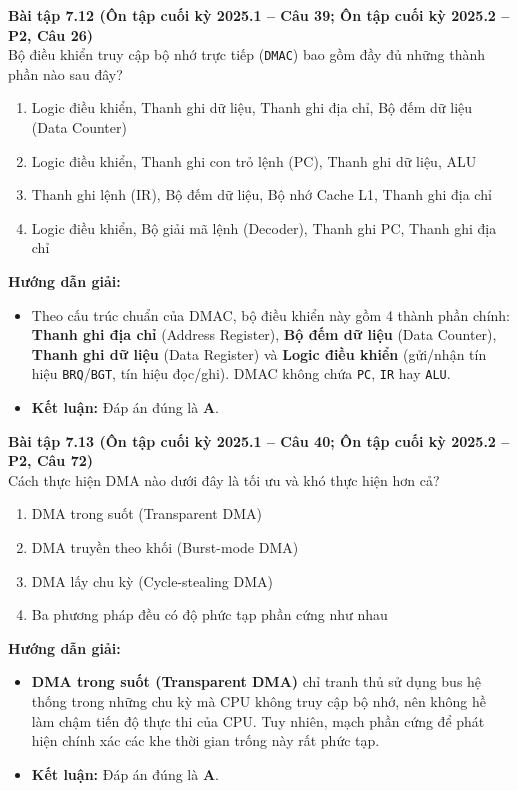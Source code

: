 \textbf{Bài tập 7.12 (Ôn tập cuối kỳ 2025.1 -- Câu 39; Ôn tập cuối kỳ 2025.2 -- P2, Câu 26)}\\
Bộ điều khiển truy cập bộ nhớ trực tiếp (\texttt{DMAC}) bao gồm đầy đủ những thành phần nào sau đây?
\begin{enumerate}[label=\Alph*.]
    \item Logic điều khiển, Thanh ghi dữ liệu, Thanh ghi địa chỉ, Bộ đếm dữ liệu (Data Counter)
    \item Logic điều khiển, Thanh ghi con trỏ lệnh (PC), Thanh ghi dữ liệu, ALU
    \item Thanh ghi lệnh (IR), Bộ đếm dữ liệu, Bộ nhớ Cache L1, Thanh ghi địa chỉ
    \item Logic điều khiển, Bộ giải mã lệnh (Decoder), Thanh ghi PC, Thanh ghi địa chỉ
\end{enumerate}
\textbf{Hướng dẫn giải:}
\begin{itemize}
    \item Theo cấu trúc chuẩn của DMAC, bộ điều khiển này gồm 4 thành phần chính: \textbf{Thanh ghi địa chỉ} (Address Register), \textbf{Bộ đếm dữ liệu} (Data Counter), \textbf{Thanh ghi dữ liệu} (Data Register) và \textbf{Logic điều khiển} (gửi/nhận tín hiệu \texttt{BRQ}/\texttt{BGT}, tín hiệu đọc/ghi). DMAC không chứa \texttt{PC}, \texttt{IR} hay \texttt{ALU}.
    \item \textbf{Kết luận:} Đáp án đúng là \textbf{A}.
\end{itemize}

\textbf{Bài tập 7.13 (Ôn tập cuối kỳ 2025.1 -- Câu 40; Ôn tập cuối kỳ 2025.2 -- P2, Câu 72)}\\
Cách thực hiện DMA nào dưới đây là tối ưu và khó thực hiện hơn cả?
\begin{enumerate}[label=\Alph*.]
    \item DMA trong suốt (Transparent DMA)
    \item DMA truyền theo khối (Burst-mode DMA)
    \item DMA lấy chu kỳ (Cycle-stealing DMA)
    \item Ba phương pháp đều có độ phức tạp phần cứng như nhau
\end{enumerate}
\textbf{Hướng dẫn giải:}
\begin{itemize}
    \item \textbf{DMA trong suốt (Transparent DMA)} chỉ tranh thủ sử dụng bus hệ thống trong những chu kỳ mà CPU không truy cập bộ nhớ, nên không hề làm chậm tiến độ thực thi của CPU. Tuy nhiên, mạch phần cứng để phát hiện chính xác các khe thời gian trống này rất phức tạp.
    \item \textbf{Kết luận:} Đáp án đúng là \textbf{A}.
\end{itemize}

